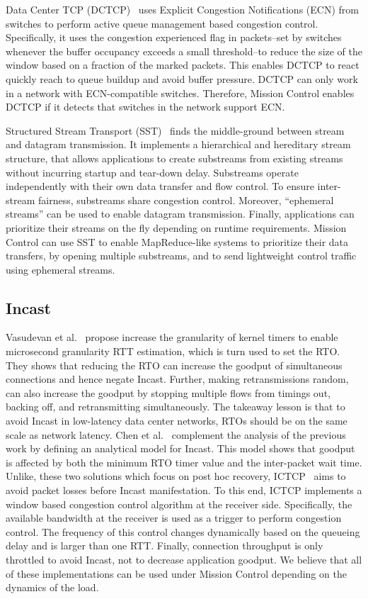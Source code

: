 \documentclass[a4paper,12pt,twoside,openright]{report}
\begin{document}
Data Center TCP (DCTCP)~\cite{Alizadeh:2010:DCT} uses Explicit Congestion
Notifications (ECN) from switches to perform active queue management based
congestion control. Specifically, it uses the congestion experienced flag in
packets--set by switches whenever the buffer occupancy exceeds a small
threshold--to reduce the size of the window based on a fraction of the marked
packets. This enables DCTCP to react quickly reach to queue buildup and avoid
buffer pressure. DCTCP can only work in a network with ECN-compatible switches.
Therefore, Mission Control enables DCTCP if it detects that switches in the
network support ECN.

Structured Stream Transport (SST)~\cite{Ford:2007:SSN} finds the middle-ground
between stream and datagram transmission. It implements a hierarchical and
hereditary stream structure, that allows applications to create substreams from
existing streams without incurring startup and tear-down delay. Substreams
operate independently with their own data transfer and flow control. To ensure
inter-stream fairness, substreams share congestion control. Moreover,
``ephemeral streams'' can be used to enable datagram transmission. Finally,
applications can prioritize their streams on the fly depending on runtime
requirements. Mission Control can use SST to enable MapReduce-like systems to
prioritize their data transfers, by opening multiple substreams, and to send
lightweight control traffic using ephemeral streams.

\subsection{Incast}
Vasudevan et al.~\cite{Vasudevan:2009:SEF} propose increase the granularity of
kernel timers to enable microsecond granularity RTT estimation, which is turn
used to set the RTO. They shows that reducing the RTO can increase the goodput
of simultaneous connections and hence negate Incast. Further, making
retransmissions random, can also increase the goodput by stopping multiple flows
from timings out, backing off, and retransmitting simultaneously. The takeaway
lesson is that to avoid Incast in low-latency data center networks, RTOs should
be on the same scale as network latency. Chen et al.~\cite{Chen:2009:UTI}
complement the analysis of the previous work by defining an analytical model for
Incast. This model shows that goodput is affected by both the minimum RTO timer
value and the inter-packet wait time. Unlike, these two solutions which focus on
post hoc recovery, ICTCP~\cite{Wu:2010:IIC} aims to avoid packet losses before
Incast manifestation. To this end, ICTCP implements a window based congestion
control algorithm at the receiver side. Specifically, the available bandwidth at
the receiver is used as a trigger to perform congestion control.
The frequency of this control changes dynamically based on the queueing delay
and is larger than one RTT. Finally, connection throughput is only throttled to
avoid Incast, not to decrease application goodput. We believe that all of these
implementations can be used under Mission Control depending on the dynamics
of the load.
\end{document}
